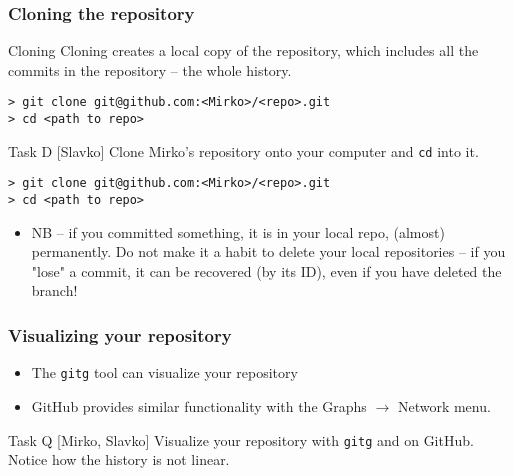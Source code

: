 
\begin{frame}[fragile]

\frametitle{Cloning the repository}

\begin{block}{Cloning}
Cloning creates a local copy of the repository, which includes all the commits in the repository -- the whole history.
\begin{verbatim}
> git clone git@github.com:<Mirko>/<repo>.git
> cd <path to repo>
\end{verbatim}
\end{block}

\begin{block}{Task D [Slavko]}
Clone Mirko's repository onto your computer and \texttt{cd} into it.
\begin{verbatim}
> git clone git@github.com:<Mirko>/<repo>.git
> cd <path to repo>
\end{verbatim}
\end{block}

\begin{itemize}
    \item NB -- if you committed something, it is in your local repo, (almost) permanently. Do not make it a habit to delete your local repositories -- if you "lose" a commit, it can be recovered (by its ID), even if you have deleted the branch!
\end{itemize}
	
\end{frame}


\begin{frame}

\frametitle{Visualizing your repository}

\begin{itemize}
	\item The \texttt{gitg} tool can visualize your repository
	\item GitHub provides similar functionality with the Graphs $\rightarrow$ Network menu.
\end{itemize}

\begin{block}{Task Q [Mirko, Slavko]}
	Visualize your repository with \texttt{gitg} and on GitHub. Notice how the history is not linear. 
\end{block}

\end{frame}

